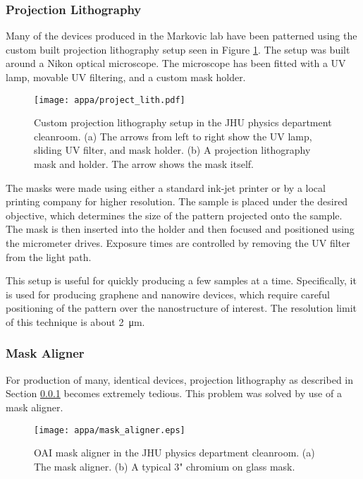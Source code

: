 \subsubsection{Projection Lithography}
\label{subsubsec:project_lith}

Many of the devices produced in the Markovic lab have been patterned using the custom built projection lithography setup seen in Figure \ref{fig:project_lith}. The setup was built around a Nikon optical microscope. The microscope has been fitted with a UV lamp, movable UV filtering, and a custom mask holder.

\begin{figure}
    \centering
    \texttt{[image: appa/project\_lith.pdf]}
    \caption{Custom projection lithography setup in the JHU physics department cleanroom. (a) The arrows from left to right show the UV lamp, sliding UV filter, and mask holder. (b) A projection lithography mask and holder. The arrow shows the mask itself.}
    \label{fig:project_lith}
\end{figure}

The masks were made using either a standard ink-jet printer or by a local printing company for higher resolution. The sample is placed under the desired objective, which determines the size of the pattern projected onto the sample. The mask is then inserted into the holder and then focused and positioned using the micrometer drives. Exposure times are  controlled by removing the UV filter from the light path. 

This setup is useful for quickly producing a few samples at a time. Specifically, it is used for producing graphene and nanowire devices, which require careful positioning of the pattern over the nanostructure of interest. The resolution limit of this technique is about \SI{2}{\micro\meter}. 

\subsubsection{Mask Aligner}
\label{subsubsec:mask_aligner}

For production of many, identical devices, projection lithography as described in Section \ref{subsubsec:project_lith} becomes extremely tedious. This problem was solved by use of a mask aligner. 

\begin{figure}
    \centering
    \texttt{[image: appa/mask\_aligner.eps]}
    \caption{OAI mask aligner in the JHU physics department cleanroom. (a) The mask aligner. (b) A typical 3" chromium on glass mask.}
    \label{fig:mask_aligner}
\end{figure}

